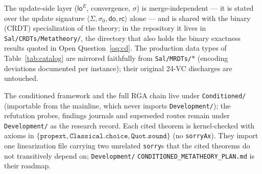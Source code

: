 \documentclass[11pt]{article}
\newcommand{\Sinit}{\sigma_0}
\newcommand{\loE}[1]{\mathsf{lo}^{#1}}
\newcommand{\lean}[1]{\texttt{#1}}
\begin{document}
The update-side layer ($\loE{E}$, convergence, $\sigma$) is
merge-independent --- it is stated over the update signature
$\langle \Sigma, \Sinit, \mathsf{do}, \mathsf{rc}\rangle$ alone --- and
is shared with the binary
(CRDT) specialization of the theory; in the repository it lives in
\lean{Sal/CRDTs/Metatheory/}, the directory that also holds the binary
exactness results quoted in Open Question~\ref{oq:cd}. The production
data types of Table~\ref{tab:catalog} are
mirrored faithfully from \lean{Sal/MRDTs/}$\ast$ (encoding deviations
documented per instance); their original 24-VC discharges are untouched.

The conditioned framework and the full RGA chain live under
\lean{Conditioned/} (importable from the mainline, which never imports
\lean{Development/}); the refutation probes, findings journals and
superseded routes remain under \lean{Development/} as the research
record. Each cited theorem is kernel-checked
with axioms in $\{\lean{propext},
\lean{Classical.choice}, \lean{Quot.sound}\}$ (no \lean{sorryAx}). They
import one linearization file carrying two unrelated \lean{sorry}s that the
cited theorems do not transitively depend on; \lean{Development/}%
\lean{CONDITIONED\_METATHEORY\_PLAN.md} is their roadmap.
\end{document}
